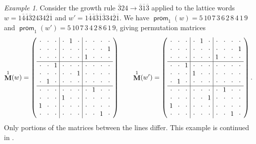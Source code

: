 \documentclass{amsart}
\theoremstyle{definition}
\theoremstyle{remark}
\newtheorem{example}[theorem]{Example}
\numberwithin{equation}{section}
\DeclareMathOperator{\prom}{\mathsf{prom}}
\DeclareMathOperator{\PM}{\mathbf{M}}
\begin{document}
\begin{example}\label{ex:prom-appliances-1}
    Consider the growth rule $\overline{3}24 \to \overline{3}\overline{1}\overline{3}$ applied to the lattice words $w = 1\overline{4}\overline{4}\overline{3}2434\overline{2}\overline{1}$ and $w' = 1\overline{4}\overline{4}\overline{3}\overline{1}\overline{3}34\overline{2}\overline{1}$. We have $\prom_1(w) = 5\,10\,7\,3\,6\,2\,8\,4\,1\,9$ and $\prom_1(w') = 5\,10\,7\,3\,4\,2\,8\,6\,1\,9$, giving permutation matrices
    \[
    \arraycolsep=3.2pt
    \PM^1(w) = \left(\begin{array}{ccc|ccc|cccc}
\cdot & \cdot & \cdot & \cdot & 1 & \cdot & \cdot & \cdot & \cdot & \cdot \\
\cdot & \cdot & \cdot & \cdot & \cdot & \cdot & \cdot & \cdot & \cdot & 1 \\
\cdot & \cdot & \cdot & \cdot & \cdot & \cdot & 1 & \cdot & \cdot & \cdot \\\hline
\cdot & \cdot & 1 & \cdot & \cdot & \cdot & \cdot & \cdot & \cdot & \cdot \\
\cdot & \cdot & \cdot & \cdot & \cdot & 1 & \cdot & \cdot & \cdot & \cdot \\
\cdot & 1 & \cdot & \cdot & \cdot & \cdot & \cdot & \cdot & \cdot & \cdot \\\hline
\cdot & \cdot & \cdot & \cdot & \cdot & \cdot & \cdot & 1 & \cdot & \cdot \\
\cdot & \cdot & \cdot & 1 & \cdot & \cdot & \cdot & \cdot & \cdot & \cdot \\
1 & \cdot & \cdot & \cdot & \cdot & \cdot & \cdot & \cdot & \cdot & \cdot \\
\cdot & \cdot & \cdot & \cdot & \cdot & \cdot & \cdot & \cdot & 1 & \cdot
\end{array}\right)
\qquad
\PM^1(w') = \left(\begin{array}{ccc|ccc|cccc}
\cdot & \cdot & \cdot & \cdot & 1 & \cdot & \cdot & \cdot & \cdot & \cdot \\
\cdot & \cdot & \cdot & \cdot & \cdot & \cdot & \cdot & \cdot & \cdot & 1 \\
\cdot & \cdot & \cdot & \cdot & \cdot & \cdot & 1 & \cdot & \cdot & \cdot \\\hline
\cdot & \cdot & 1 & \cdot & \cdot & \cdot & \cdot & \cdot & \cdot & \cdot \\
\cdot & \cdot & \cdot & 1 & \cdot & \cdot & \cdot & \cdot & \cdot & \cdot \\
\cdot & 1 & \cdot & \cdot & \cdot & \cdot & \cdot & \cdot & \cdot & \cdot \\\hline
\cdot & \cdot & \cdot & \cdot & \cdot & \cdot & \cdot & 1 & \cdot & \cdot \\
\cdot & \cdot & \cdot & \cdot & \cdot & 1 & \cdot & \cdot & \cdot & \cdot \\
1 & \cdot & \cdot & \cdot & \cdot & \cdot & \cdot & \cdot & \cdot & \cdot \\
\cdot & \cdot & \cdot & \cdot & \cdot & \cdot & \cdot & \cdot & 1 & \cdot
\end{array}\right).
    \]
    Only portions of the matrices between the lines differ. This example is continued in .
\end{example}
\end{document}

